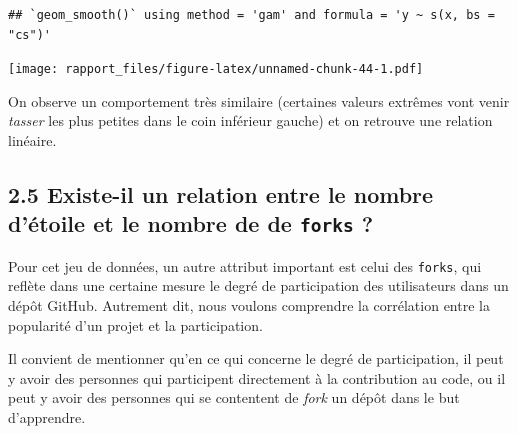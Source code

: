 \documentclass[
]{article}
\newenvironment{Shaded}{\begin{snugshade}}{\end{snugshade}}
\newcommand{\AttributeTok}[1]{\textcolor[rgb]{0.13,0.29,0.53}{#1}}
\newcommand{\DecValTok}[1]{\textcolor[rgb]{0.00,0.00,0.81}{#1}}
\newcommand{\FunctionTok}[1]{\textcolor[rgb]{0.13,0.29,0.53}{\textbf{#1}}}
\newcommand{\NormalTok}[1]{#1}
\newcommand{\SpecialCharTok}[1]{\textcolor[rgb]{0.81,0.36,0.00}{\textbf{#1}}}
\newcommand{\StringTok}[1]{\textcolor[rgb]{0.31,0.60,0.02}{#1}}
\begin{document}
\begin{Shaded}
\end{Shaded}

\begin{verbatim}
## `geom_smooth()` using method = 'gam' and formula = 'y ~ s(x, bs = "cs")'
\end{verbatim}

\texttt{[image: rapport\_files/figure-latex/unnamed-chunk-44-1.pdf]}

On observe un comportement très similaire (certaines valeurs extrêmes
vont venir \emph{tasser} les plus petites dans le coin inférieur gauche)
et on retrouve une relation linéaire.

\subsection{\texorpdfstring{2.5 Existe-il un relation entre le nombre
d'étoile et le nombre de de \texttt{forks}
?}{2.5 Existe-il un relation entre le nombre d'étoile et le nombre de de forks ?}}\label{existe-il-un-relation-entre-le-nombre-duxe9toile-et-le-nombre-de-de-forks}

Pour cet jeu de données, un autre attribut important est celui des
\texttt{forks}, qui reflète dans une certaine mesure le degré de
participation des utilisateurs dans un dépôt GitHub. Autrement dit, nous
voulons comprendre la corrélation entre la popularité d'un projet et la
participation.

Il convient de mentionner qu'en ce qui concerne le degré de
participation, il peut y avoir des personnes qui participent directement
à la contribution au code, ou il peut y avoir des personnes qui se
contentent de \emph{fork} un dépôt dans le but d'apprendre.
\end{document}

